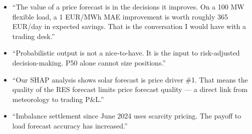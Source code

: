 \begin{itemize}
  \item ``The value of a price forecast is in the decisions it improves.
        On a 100 MW flexible load, a 1 EUR/MWh MAE improvement is worth
        roughly 365 EUR/day in expected savings. That is the conversation
        I would have with a trading desk.''
  \item ``Probabilistic output is not a nice-to-have. It is the input to
        risk-adjusted decision-making. P50 alone cannot size positions.''
  \item ``Our SHAP analysis shows solar forecast is price driver \#1.
        That means the quality of the RES forecast limits price forecast
        quality — a direct link from meteorology to trading P\&L.''
  \item ``Imbalance settlement since June 2024 uses scarcity pricing.
        The payoff to load forecast accuracy has increased.''
\end{itemize}
